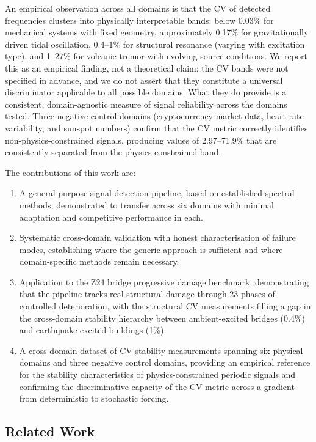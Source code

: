 \documentclass[11pt,a4paper]{article}
\begin{document}
An empirical observation across all domains is that the CV of detected frequencies clusters into physically interpretable bands: below 0.03\% for mechanical systems with fixed geometry, approximately 0.17\% for gravitationally driven tidal oscillation, 0.4--1\% for structural resonance (varying with excitation type), and 1--27\% for volcanic tremor with evolving source conditions. We report this as an empirical finding, not a theoretical claim; the CV bands were not specified in advance, and we do not assert that they constitute a universal discriminator applicable to all possible domains. What they do provide is a consistent, domain-agnostic measure of signal reliability across the domains tested. Three negative control domains (cryptocurrency market data, heart rate variability, and sunspot numbers) confirm that the CV metric correctly identifies non-physics-constrained signals, producing values of 2.97--71.9\% that are consistently separated from the physics-constrained band.

The contributions of this work are:
\begin{enumerate}
  \item A general-purpose signal detection pipeline, based on established spectral methods, demonstrated to transfer across six domains with minimal adaptation and competitive performance in each.
  \item Systematic cross-domain validation with honest characterisation of failure modes, establishing where the generic approach is sufficient and where domain-specific methods remain necessary.
  \item Application to the Z24 bridge progressive damage benchmark, demonstrating that the pipeline tracks real structural damage through 23 phases of controlled deterioration, with the structural CV measurements filling a gap in the cross-domain stability hierarchy between ambient-excited bridges (0.4\%) and earthquake-excited buildings (1\%).
  \item A cross-domain dataset of CV stability measurements spanning six physical domains and three negative control domains, providing an empirical reference for the stability characteristics of physics-constrained periodic signals and confirming the discriminative capacity of the CV metric across a gradient from deterministic to stochastic forcing.
\end{enumerate}

\subsection{Related Work}
\label{sec:related-work}
\end{document}
